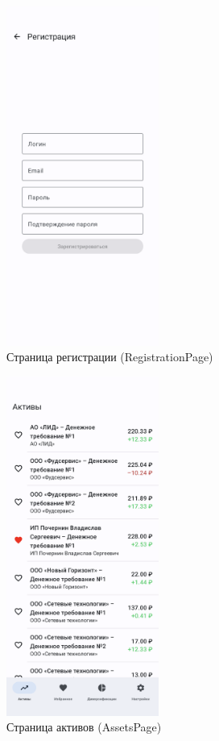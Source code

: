 \documentclass[a4paper, 14pt]{article}
\begin{document}
\begin{figure}[H]
    \centering
    \includegraphics[width=5cm]{resources/6.png}
    \caption{Страница регистрации (RegistrationPage)}
\end{figure}

\begin{figure}[H]
    \centering
    \includegraphics[width=5cm]{resources/7.png}
    \caption{Страница активов (AssetsPage)}
\end{figure}
\end{document}
